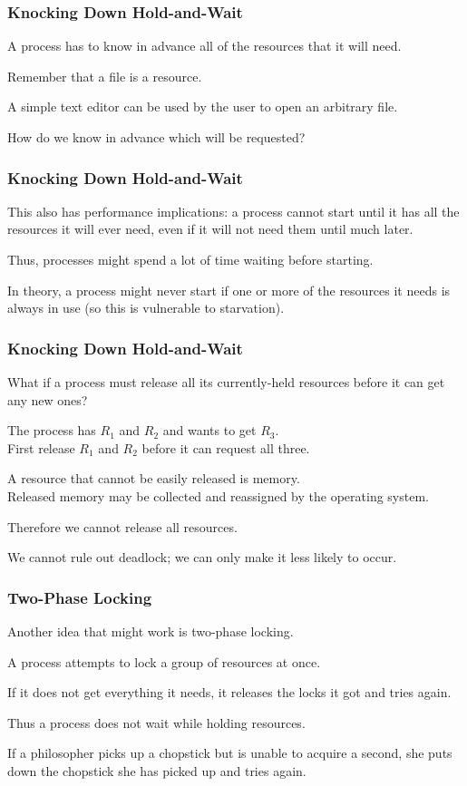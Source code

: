 \begin{frame}
\frametitle{Knocking Down Hold-and-Wait}

A process has to know in advance all of the resources that it will need. 

Remember that a file is a resource. 

A simple text editor can be used by the user to open an arbitrary file. 

How do we know in advance which will be requested?

\end{frame}

\begin{frame}
\frametitle{Knocking Down Hold-and-Wait}

This also has performance implications: a process cannot start until it has all the resources it will ever need, even if it will not need them until much later. 

Thus, processes might spend a lot of time waiting before starting.

In theory, a process might never start if one or more of the resources it needs is always in use (so this is vulnerable to starvation).


\end{frame}

\begin{frame}
\frametitle{Knocking Down Hold-and-Wait}

What if a process must release all its currently-held resources before it can get any new ones? 

The process has $R_{1}$ and $R_{2}$ and wants to get $R_{3}$.\\
\quad First release $R_{1}$ and $R_{2}$ before it can request all three. 

A resource that cannot be easily released is memory.\\
\quad Released memory may be collected and reassigned by the operating system. 

Therefore we cannot release all resources.

We cannot rule out deadlock; we can only make it less likely to occur.

\end{frame}

\begin{frame}
\frametitle{Two-Phase Locking}

Another idea that might work is \alert{two-phase locking}. 

A process attempts to lock a group of resources at once. 

If it does not get everything it needs, it releases the locks it got and tries again. 

Thus a process does not wait while holding resources. 

If a philosopher picks up a chopstick but is unable to acquire a second, she puts down the chopstick she has picked up and tries again.

\end{frame}

